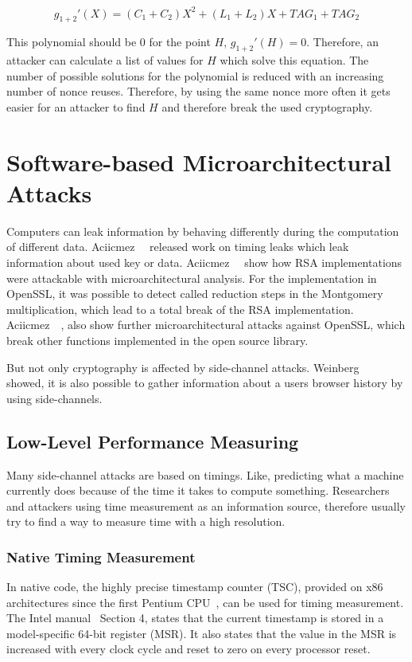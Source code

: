 \[g_{1+2}'(X) = (C_{1} + C_{2})X^2 + (L_1 + L_2)X + TAG_1 + TAG_2\]

This polynomial should be $0$ for the point $H$, $g_{1+2}'(H) = 0$. Therefore,
an attacker can calculate a list of values for $H$ which solve this equation.
The number of possible solutions for the polynomial is reduced with an
increasing number of nonce reuses. Therefore, by using the same nonce more often
it gets easier for an attacker to find $H$ and therefore break the used
cryptography.

\section{Software-based Microarchitectural Attacks}

Computers can leak information by behaving differently during the computation of
different data. Aciicmez~\etal~\cite{branchpower, rsaanal, branchopenssl}
released work on timing leaks which leak information about used key or data.
Aciicmez~\etal~\cite{rsaanal} show how RSA implementations were attackable with
microarchitectural analysis. For the implementation in OpenSSL, it was possible
to detect called reduction steps in the Montgomery multiplication, which lead to
a total break of the RSA implementation. Aciicmez~\etal~\cite{branchopenssl},
also show further microarchitectural attacks against OpenSSL, which break other
functions implemented in the open source library.

But not only cryptography is affected by side-channel attacks.
Weinberg~\etal~\cite{weinberg2011still} showed, it is also possible to gather
information about a users browser history by using side-channels.

\subsection{Low-Level Performance Measuring}

Many side-channel attacks are based on timings. Like, predicting what a machine
currently does because of the time it takes to compute something. Researchers
and attackers using time measurement as an information source, therefore usually
try to find a way to measure time with a high resolution.

\subsubsection{Native Timing Measurement}

In native code, the highly precise timestamp counter (TSC), provided on x86
architectures since the first Pentium CPU~\cite{intelsys}, can be used for
timing measurement. The Intel manual~\cite{intelsys} Section 4, states that the
current timestamp is stored in a model-specific 64-bit register (MSR). It also
states that the value in the MSR is increased with every clock cycle and reset
to zero on every processor reset.

